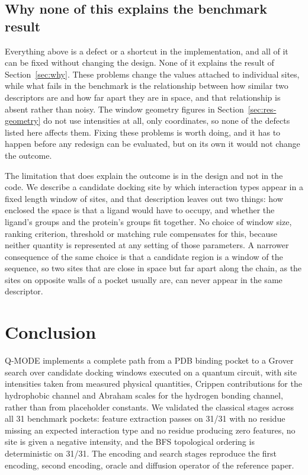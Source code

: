 \subsection*{Why none of this explains the benchmark result}

Everything above is a defect or a shortcut in the implementation, and all of it can be
fixed without changing the design. None of it explains the result of
Section~\ref{sec:why}. These problems change the values attached to individual sites,
while what fails in the benchmark is the relationship between how similar two descriptors
are and how far apart they are in space, and that relationship is absent rather than
noisy. The window geometry figures in Section~\ref{sec:res-geometry} do not use
intensities at all, only coordinates, so none of the defects listed here affects them.
Fixing these problems is worth doing, and it has to happen before any redesign can be
evaluated, but on its own it would not change the outcome.

The limitation that does explain the outcome is in the design and not in the code. We
describe a candidate docking site by which interaction types appear in a fixed length
window of sites, and that description leaves out two things: how enclosed the space is
that a ligand would have to occupy, and whether the ligand's groups and the protein's
groups fit together. No choice of window size, ranking criterion, threshold or matching
rule compensates for this, because neither quantity is represented at any setting of
those parameters. A narrower consequence of the same choice is that a candidate region is
a window of the sequence, so two sites that are close in space but far apart along the
chain, as the sites on opposite walls of a pocket usually are, can never appear in the
same descriptor.


\section{Conclusion}
\label{sec:conclusion}

Q-MODE implements a complete path from a PDB binding pocket to a Grover search over
candidate docking windows executed on a quantum circuit, with site intensities taken from
measured physical quantities, Crippen contributions for the hydrophobic channel and
Abraham scales for the hydrogen bonding channel, rather than from placeholder constants. We validated the classical stages across all 31 benchmark pockets: feature
extraction passes on 31/31 with no residue missing an expected interaction type and no
residue producing zero features, no site is given a negative intensity, and the BFS
topological ordering is deterministic on 31/31. The encoding and search stages reproduce
the first encoding, second encoding, oracle and diffusion operator of the reference
paper.

